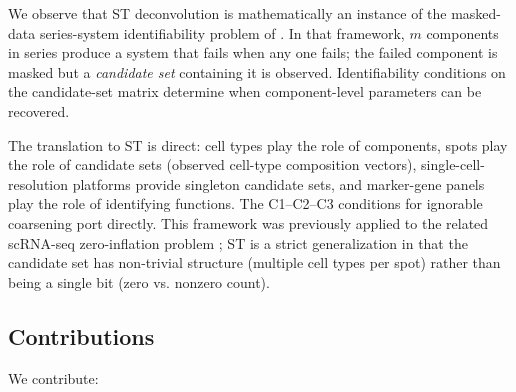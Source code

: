 We observe that ST deconvolution is mathematically an instance of the
masked-data series-system identifiability problem of
\citet{towell2026masked}. In that framework, $m$ components in
series produce a system that fails when any one fails; the failed
component is masked but a \emph{candidate set} containing it is
observed. Identifiability conditions on the candidate-set matrix
determine when component-level parameters can be recovered.

The translation to ST is direct: cell types play the role of
components, spots play the role of candidate sets (observed cell-type
composition vectors), single-cell-resolution platforms provide
singleton candidate sets, and marker-gene panels play the role of
identifying functions. The C1--C2--C3 conditions for ignorable
coarsening port directly. This framework was previously applied to
the related scRNA-seq zero-inflation problem
\citep{towell2026scrnacoarsening,jiang2022zero}; ST is a strict
generalization in that the candidate set has non-trivial structure
(multiple cell types per spot) rather than being a single bit (zero
vs. nonzero count).

\subsection{Contributions}

We contribute:

